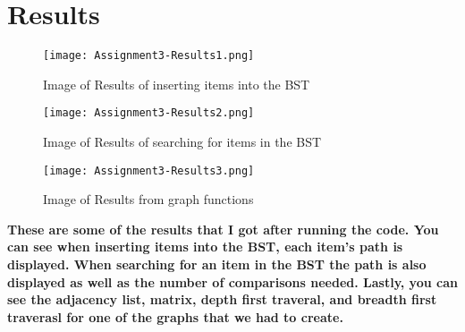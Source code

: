 \documentclass{article}
\begin{document}
\section{Results}
\begin{figure}[h]
    \centering
    \texttt{[image: Assignment3-Results1.png]}
    \caption{Image of Results of inserting items into the BST}
    \label{fig:Results1}
\end{figure}
\begin{figure}[h]
    \centering
    \texttt{[image: Assignment3-Results2.png]}
    \caption{Image of Results of searching for items in the BST}
    \label{fig:Results2}
\end{figure}
\begin{figure}[h]
    \centering
    \texttt{[image: Assignment3-Results3.png]}
    \caption{Image of Results from graph functions}
    \label{fig:Results3}
\end{figure}
\newpage
\textbf{These are some of the results that I got after running the code. You can see when inserting items into the BST, each item's path is displayed. When searching for an item in the BST the path is also displayed as well as the number of comparisons needed. Lastly, you can see the adjacency list, matrix, depth first traveral, and breadth first traverasl for one of the graphs that we had to create.}
\end{document}
